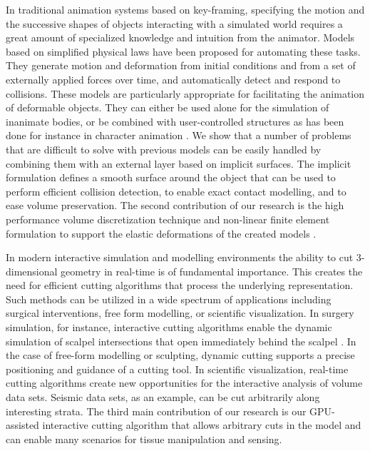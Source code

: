 In traditional animation systems based on key-framing, specifying the motion and the successive shapes of objects interacting with a simulated 
world requires a great amount of specialized knowledge and intuition from the animator. Models based on simplified physical laws have been 
proposed for automating these tasks. They generate motion and deformation from initial conditions and from a set of externally applied forces 
over time, and automatically detect and respond to collisions. These models are particularly appropriate for facilitating the animation of 
deformable objects. They can either be used alone for the simulation of inanimate bodies, or be combined with user-controlled structures as 
has been done for instance in character animation \cite{chadwick1989layered,miller1988motion}. We show that a number of problems that are difficult
to solve with previous models can be easily handled by combining them with an external layer based on implicit surfaces. The implicit formulation
defines a smooth surface around the object that can be used to perform efficient collision detection, to enable exact contact modelling, and to ease
volume preservation. The second contribution of our research is the high performance volume discretization technique and non-linear finite element 
formulation to support the elastic deformations of the created models \cite{Shirazian2013}. 

In modern interactive simulation and modelling environments the ability to cut 3-dimensional geometry in real-time is of fundamental importance. 
This creates the need for efficient cutting algorithms that process the underlying representation. Such methods can be utilized in a wide spectrum 
of applications including surgical interventions, free form modelling, or scientific visualization. In surgery simulation, for instance, interactive 
cutting algorithms enable the dynamic simulation of scalpel intersections that open immediately behind the scalpel \cite{Nienhuys2001}. In the 
case of free-form modelling or sculpting, dynamic cutting supports a precise positioning and guidance of a cutting tool. In scientific visualization, 
real-time cutting algorithms create new opportunities for the interactive analysis of volume data sets. Seismic data sets, as an example, can be 
cut arbitrarily along interesting strata. The third main contribution of our research is our GPU-assisted interactive cutting algorithm that allows
arbitrary cuts in the model and can enable many scenarios for tissue manipulation and sensing. 

